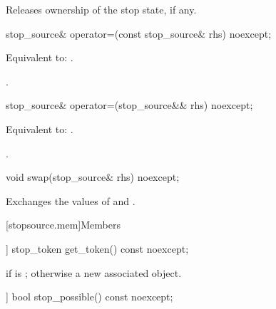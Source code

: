 \begin{itemdescr}
\pnum
\effects
Releases ownership of the stop state, if any.
\end{itemdescr}

%
\begin{itemdecl}
stop_source& operator=(const stop_source& rhs) noexcept;
\end{itemdecl}

\begin{itemdescr}
\pnum
\effects
Equivalent to: .

\pnum
\returns
{}.
\end{itemdescr}

%
\begin{itemdecl}
stop_source& operator=(stop_source&& rhs) noexcept;
\end{itemdecl}

\begin{itemdescr}
\pnum
\effects
Equivalent to: .

\pnum
\returns
{}.
\end{itemdescr}

%
\begin{itemdecl}
void swap(stop_source& rhs) noexcept;
\end{itemdecl}

\begin{itemdescr}
\pnum
\effects
Exchanges the values of  and .
\end{itemdescr}

[stopsource.mem]{Members}

%
\begin{itemdecl}
[[nodiscard]] stop_token get_token() const noexcept;
\end{itemdecl}

\begin{itemdescr}
\pnum
\returns
{} if  is ;
otherwise a new associated  object.
\end{itemdescr}


%
\begin{itemdecl}
[[nodiscard]] bool stop_possible() const noexcept;
\end{itemdecl}

